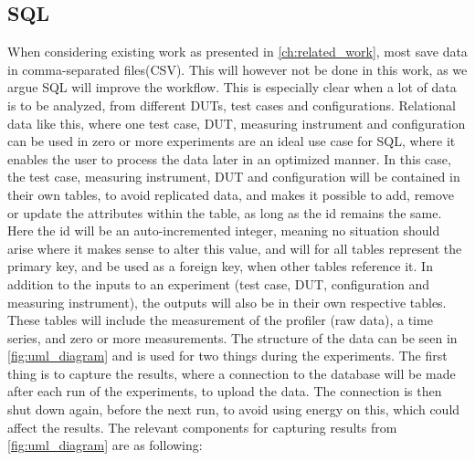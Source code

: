 \subsection{SQL}\label{subsec:sql}

When considering existing work as presented in \cref*{ch:related_work}, most save data in comma-separated files(CSV)\cite*[]{Koedijk2022diff,Pereira2017}. This will however not be done in this work, as we argue SQL will improve the workflow. This is especially clear when a lot of data is to be analyzed, from different DUTs, test cases and configurations. Relational data like this, where one test case, DUT, measuring instrument and configuration can be used in zero or more experiments are an ideal use case for SQL, where it enables the user to process the data later in an optimized manner\cite*[]{Silberschatz2019}. In this case, the test case, measuring instrument, DUT and configuration will be contained in their own tables, to avoid replicated data, and makes it possible to add, remove or update the attributes within the table, as long as the id remains the same. Here the id will be an auto-incremented integer, meaning no situation should arise where it makes sense to alter this value, and will for all tables represent the primary key, and be used as a foreign key, when other tables reference it. In addition to the inputs to an experiment (test case, DUT, configuration and measuring instrument), the outputs will also be in their own respective tables. These tables will include the measurement of the profiler (raw data), a time series, and zero or more measurements. The structure of the data can be seen in \cref{fig:uml_diagram} and is used for two things during the experiments. The first thing is to capture the results, where a connection to the database will be made after each run of the experiments, to upload the data. The connection is then shut down again, before the next run, to avoid using energy on this, which could affect the results. The relevant components for capturing results from \cref*{fig:uml_diagram} are as following:


